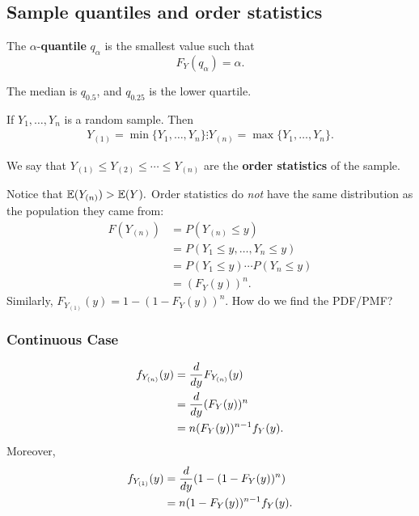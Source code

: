     \subsection{Sample quantiles and order statistics}
\begin{definition}
		The $\alpha$-\textbf{quantile} $q_\alpha$ is the smallest value such that
		$$F_Y(q_\alpha)=\alpha.$$
\end{definition}
\begin{eg}
		The median is $q_{0.5}$, and $q_{0.25}$ is the lower quartile.
		\end{eg}
\begin{notation}
    If $Y_1,\dots,Y_n$ is a random sample. Then 
   	\begin{align*}
    Y_{(1)}=\min\{Y_1,\dots,Y_n\}
    \vdots
    Y_{(n)}=\max\{Y_1,\dots,Y_n\}.
	\end{align*}
\end{notation}
\begin{definition}
    We say that $Y_{(1)}\leq Y_{(2)}\leq \cdots \leq Y_{(n)}$ are the \textbf{order statistics} of the sample. 
\end{definition} 
\begin{remark}
    Notice that $\mathbb E(Y_{(n)})>\mathbb E(Y).$ Order statistics do \textit{not} have the same distribution as the population they came from: 
    \begin{align*}
            F(Y_{(n)})&=P(Y_{(n)}\leq y)\\
			&=P(Y_1\leq y, \dots, Y_n\leq y) \\
			&=P(Y_1\leq y)\cdots P(Y_n\leq y) \\
			&=(F_Y(y))^n.
    \end{align*}
Similarly, $F_{Y_{(1)}}(y)=1-(1-F_Y(y))^n.$ How do we find the PDF/PMF?
\end{remark}

\subsubsection{Continuous Case}
\begin{align*}
    f_{Y_{(n)}}(y)&=\frac{d}{dy}F_{Y_{(n)}}(y)\\
    &=\frac{d}{dy}(F_Y(y))^n \\
    &=n(F_Y(y))^{n-1}f_Y(y).
\end{align*}
Moreover,
\begin{align*}
    f_{Y_{(1)}}(y)&=\frac{d}{dy}(1-(1-F_Y(y))^n) \\
    &=n(1-F_Y(y))^{n-1}f_Y(y).
\end{align*}

